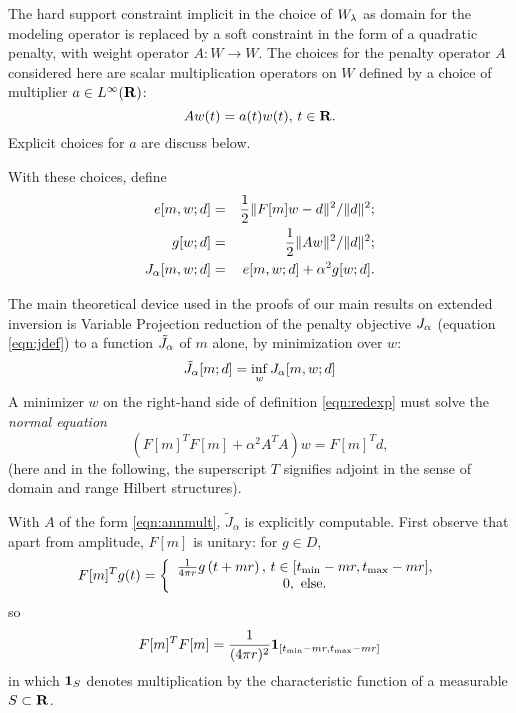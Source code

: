 The hard
support constraint implicit in the choice of $W_{\lambda}$ as domain for the
modeling operator is replaced by a soft constraint in the form of a
quadratic penalty, with weight operator $A:W \rightarrow W$.
The choices for the penalty operator $A$ considered here are scalar 
multiplication operators on $W$ defined by a choice of multiplier $a \in L^{\infty}({\bf R})$:
\begin{equation}
  \label{eqn:annmult}
  A w(t)= a(t)w(t), \, t\in {\bf R}.
\end{equation}
Explicit choices
for $a$ are discuss below.

With these choices, define
\begin{eqnarray}
  \label{eqn:edef}
  e[m,w;d] & = & \frac{1}{2}\|F[m]w-d\|^2/\|d\|^2;\\
  \label{eqn:gdef}
  g[w;d] & = & \frac{1}{2}\|Aw\|^2/\|d\|^2;\\
  \label{eqn:jdef}
  J_{\alpha}[m,w;d] & = & e[m,w;d] + \alpha^2g[w;d].
\end{eqnarray}

The main theoretical device used in the proofs of our main results on 
extended inversion is Variable Projection reduction of the penalty objective $J_{\alpha}$
(equation \ref{eqn:jdef}) to a function $\tilde{J}_{\alpha}$ of 
$m$ alone, by minimization over $w$:
\begin{equation}
  \label{eqn:redexp}
  \tilde{J}_{\alpha}[m;d] = \inf_w J_{\alpha}[m,w;d]
\end{equation}
A minimizer $w$ on the right-hand side of definition
\ref{eqn:redexp} must solve the {\em normal equation}
\begin{equation}
  \label{eqn:norm}
  (F[m]^TF[m]+\alpha^2A^TA)w= F[m]^Td, 
\end{equation}
(here and in the following, the superscript $T$ signifies adjoint in
the sense of domain and range Hilbert structures).

With $A$ of the form \ref{eqn:annmult}, $\tilde{J}_{\alpha}$ is explicitly
computable. First observe that apart from amplitude, $F[m]$ is
unitary: for $g \in D$,
\begin{equation}
\label{eqn:tran}
F[m]^T g (t) =
\left\{
  \begin{array}{c}
    \frac{1}{4\pi r}g\left(t+mr\right), \, t \in [t_{\rm min}-mr,
    t_{\rm max}-mr],\\
    0, \mbox{ else.}
  \end{array}
\right.
\end{equation}
so
\begin{equation}
  \label{eqn:unit}
  F[m]^TF[m] = \frac{1}{(4\pi r)^2}{\bf 1}_{[t_{\rm min}-mr,  
    t_{\rm max}-mr]}
\end{equation}
in which ${\bf 1}_{S}$ denotes
multiplication by the characteristic function of a measurable 
$S \subset {\bf R}$.

